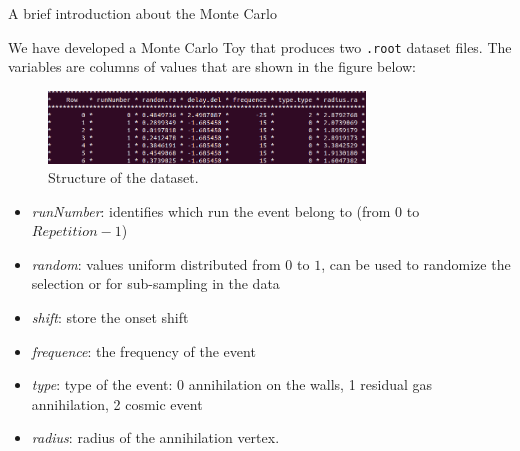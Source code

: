 \documentclass[8pt]{beamer}
\begin{document}
\begin{frame}{A brief introduction about the Monte Carlo}

We have developed a Monte Carlo Toy that produces two \texttt{.root} dataset files. The variables are columns of values that are shown in the figure below:
\begin{figure}[hbtp]
 \centering
 \includegraphics[width = 0.75\textwidth]{DatasetContent.png}
 \caption{ Structure of the dataset.}
 \end{figure}

\begin{itemize}
\item \textit{runNumber}: identifies which run the event belong to (from $0$ to $Repetition -1$) 
\item \textit{random}: values uniform distributed from $0$ to $1$, can be used to randomize the selection or for sub-sampling in the data
\item \textit{shift}: store the onset shift
\item \textit{frequence}: the frequency of the event
\item \textit{type}: type of the event: 0 annihilation on the walls, 1 residual gas annihilation, 2 cosmic event
\item \textit{radius}: radius of the annihilation vertex.
\end{itemize}

\end{frame}
\end{document}
